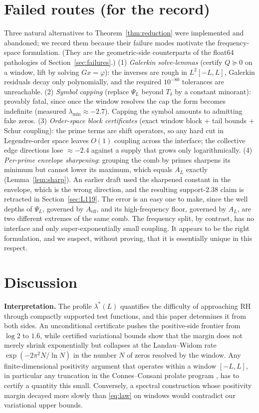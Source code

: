 ﻿\documentclass[11pt]{article}
\newcommand{\lmin}{\lambda^{*}}
\newcommand{\lammin}{\lambda_{\min}}
\newcommand{\Aeff}{A_{\mathrm{eff}}}
\begin{document}
\section{Failed routes (for the record)}\label{sec:failures2}

Three natural alternatives to Theorem~\ref{thm:reduction} were
implemented and abandoned; we record them because their failure modes
motivate the frequency-space formulation.  (They are the geometric-side
counterparts of the float64 pathologies of
Section~\ref{sec:failures}.)
(1) \emph{Galerkin solve-lemmas} (certify $Q\succeq0$ on a window,
lift by solving $Gx=\varphi$): the inverses are rough in $L^2[-L,L]$,
Galerkin residuals decay only polynomially, and the required
$10^{-80}$ tolerances are unreachable.
(2) \emph{Symbol capping} (replace $\Psi_L$ beyond $T_\delta$ by a
constant minorant): provably fatal, since once the window resolves the
cap the form becomes indefinite (measured $\lammin\approx-2.7$).
Capping the symbol amounts to admitting fake zeros.
(3) \emph{Order-space block certificates} (exact window block + tail
bounds + Schur coupling): the prime terms are shift operators, so any
hard cut in Legendre-order space leaves $O(1)$ coupling across the
interface; the collective edge directions lose $\approx-2.4$ against a
supply that grows only logarithmically.
(4) \emph{Per-prime envelope sharpening}: grouping the comb by primes
sharpens its minimum but cannot lower its maximum, which equals $A_L$
exactly (Lemma~\ref{lem:sharp}).  An earlier draft used the sharpened
constant in the envelope, which is the wrong direction, and the
resulting support-$2.38$ claim is retracted in
Section~\ref{sec:L119}.  The error is an easy one to make, since the
well depths of $\Psi_L$, governed by $\Aeff$, and its high-frequency
floor, governed by $A_L$, are two different extremes of the same comb.
The frequency split, by contrast, has no interface and only
super-exponentially small coupling.  It appears to be the right
formulation, and we suspect, without proving, that it is essentially
unique in this respect.

\section{Discussion}\label{sec:discussion}

\textbf{Interpretation.}  The profile $\lmin(L)$ quantifies the
difficulty of approaching RH through compactly supported test
functions, and this paper determines it from both sides.  An
unconditional certificate pushes the positive-side frontier from
$\log2$ to $1.6$, while certified variational bounds show that the
margin does not merely shrink exponentially but collapses at the
Landau--Widom rate $\exp(-2\pi^{2}N/\ln N)$ in the number $N$ of zeros
resolved by the window.  Any finite-dimensional positivity argument
that operates within a window $[-L,L]$, in particular any truncation in
the Connes--Consani prolate program \cite{ConnesConsani2021}, has to
certify a quantity this small.  Conversely, a spectral construction
whose positivity margin decayed more slowly than \eqref{eq:law} on
windows would contradict our variational upper bounds.
\end{document}
